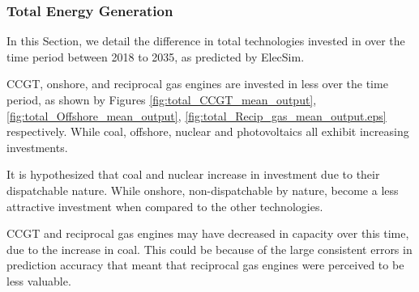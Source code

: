 







\subsubsection{Total Energy Generation}



In this Section, we detail the difference in total technologies invested in over the time period between 2018 to 2035, as predicted by ElecSim.

CCGT, onshore, and reciprocal gas engines are invested in less over the time period, as shown by Figures \ref{fig:total_CCGT_mean_output}, \ref{fig:total_Offshore_mean_output}, \ref{fig:total_Recip_gas_mean_output.eps} respectively. While coal, offshore, nuclear and photovoltaics all exhibit increasing investments.

It is hypothesized that coal and nuclear increase in investment due to their dispatchable nature. While onshore, non-dispatchable by nature, become a less attractive investment when compared to the other technologies.

CCGT and reciprocal gas engines may have decreased in capacity over this time, due to the increase in coal. This could be because of the large consistent errors in prediction accuracy that meant that reciprocal gas engines were perceived to be less valuable.


